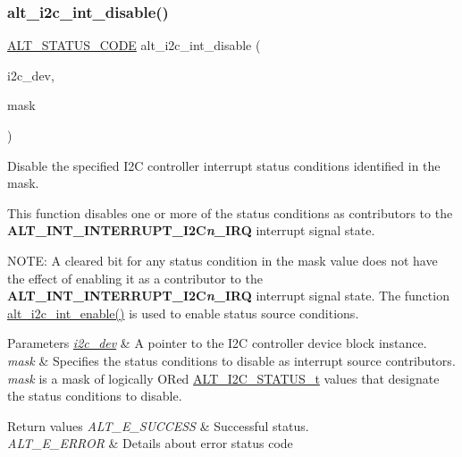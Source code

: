\subsubsection{\texorpdfstring{alt\_i2c\_int\_disable()}{alt\_i2c\_int\_disable()}}
{\footnotesize\ttfamily \mbox{\hyperlink{hwlib_8h_abdb0d369f069723ca55d6c94bcaaaa12}{A\+L\+T\+\_\+\+S\+T\+A\+T\+U\+S\+\_\+\+C\+O\+DE}} alt\+\_\+i2c\+\_\+int\+\_\+disable (\begin{DoxyParamCaption}\item[{\mbox{\hyperlink{structALT__I2C__DEV__s}{A\+L\+T\+\_\+\+I2\+C\+\_\+\+D\+E\+V\+\_\+t}} $\ast$}]{i2c\+\_\+dev,  }\item[{const uint32\+\_\+t}]{mask }\end{DoxyParamCaption})}

Disable the specified I2C controller interrupt status conditions identified in the mask.

This function disables one or more of the status conditions as contributors to the {\bfseries{A\+L\+T\+\_\+\+I\+N\+T\+\_\+\+I\+N\+T\+E\+R\+R\+U\+P\+T\+\_\+\+I2C{\itshape n}\+\_\+\+I\+RQ}} interrupt signal state.

N\+O\+TE\+: A cleared bit for any status condition in the mask value does not have the effect of enabling it as a contributor to the {\bfseries{A\+L\+T\+\_\+\+I\+N\+T\+\_\+\+I\+N\+T\+E\+R\+R\+U\+P\+T\+\_\+\+I2C{\itshape n}\+\_\+\+I\+RQ}} interrupt signal state. The function \mbox{\hyperlink{group__ALT__I2C__INT_ga8b2d5d1cdd08eb4c7d431bf42532ef85}{alt\+\_\+i2c\+\_\+int\+\_\+enable()}} is used to enable status source conditions.


\begin{DoxyParams}{Parameters}
{\em \mbox{\hyperlink{structi2c__dev}{i2c\+\_\+dev}}} & A pointer to the I2C controller device block instance.\\
\hline
{\em mask} & Specifies the status conditions to disable as interrupt source contributors. {\itshape mask} is a mask of logically OR\textquotesingle{}ed \mbox{\hyperlink{group__ALT__I2C_gaff6fbc8f47536dd27035588f0ea138fe}{A\+L\+T\+\_\+\+I2\+C\+\_\+\+S\+T\+A\+T\+U\+S\+\_\+t}} values that designate the status conditions to disable.\\
\hline
\end{DoxyParams}

\begin{DoxyRetVals}{Return values}
{\em A\+L\+T\+\_\+\+E\+\_\+\+S\+U\+C\+C\+E\+SS} & Successful status. \\
\hline
{\em A\+L\+T\+\_\+\+E\+\_\+\+E\+R\+R\+OR} & Details about error status code \\
\hline
\end{DoxyRetVals}
\mbox{\label{group__ALT__I2C__INT_ga8b2d5d1cdd08eb4c7d431bf42532ef85}} 
